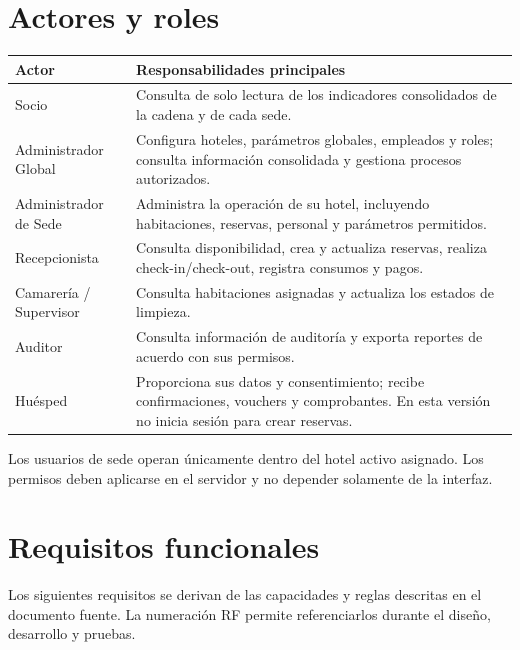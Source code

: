 \documentclass[12pt,a4paper]{article}
\begin{document}
\section{Actores y roles}

\begin{longtable}{p{3.2cm} p{10.2cm}}
\toprule
\textbf{Actor} & \textbf{Responsabilidades principales}\\
\midrule
Socio & Consulta de solo lectura de los indicadores consolidados de la cadena y de cada sede.\\
Administrador Global & Configura hoteles, parámetros globales, empleados y roles; consulta información consolidada y gestiona procesos autorizados.\\
Administrador de Sede & Administra la operación de su hotel, incluyendo habitaciones, reservas, personal y parámetros permitidos.\\
Recepcionista & Consulta disponibilidad, crea y actualiza reservas, realiza check-in/check-out, registra consumos y pagos.\\
Camarería / Supervisor & Consulta habitaciones asignadas y actualiza los estados de limpieza.\\
Auditor & Consulta información de auditoría y exporta reportes de acuerdo con sus permisos.\\
Huésped & Proporciona sus datos y consentimiento; recibe confirmaciones, vouchers y comprobantes. En esta versión no inicia sesión para crear reservas.\\
\bottomrule
\end{longtable}

Los usuarios de sede operan únicamente dentro del hotel activo asignado. Los permisos deben aplicarse en el servidor y no depender solamente de la interfaz.

\section{Requisitos funcionales}

Los siguientes requisitos se derivan de las capacidades y reglas descritas en el documento fuente. La numeración RF permite referenciarlos durante el diseño, desarrollo y pruebas.
\end{document}
